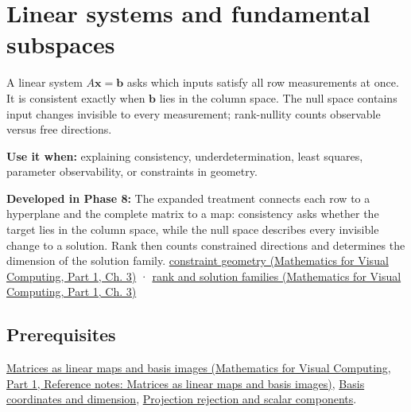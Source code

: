 \hypertarget{appendix-8572a4a060c1}{}\label{referencestart:appendix-8572a4a060c1}
\section{Linear systems and fundamental subspaces}\label{appendix-8572a4a060c1-linear-systems-and-fundamental-subspaces}

\hypertarget{appendix-8572a4a060c1-linear-systems-and-fundamental-subspaces}{}

A linear system \(A\mathbf x=\mathbf b\) asks which inputs satisfy all row measurements at once. It is consistent exactly when \(\mathbf b\) lies in the column space. The null space contains input changes invisible to every measurement; rank-nullity counts observable versus free directions.

\textbf{Use it when:} explaining consistency, underdetermination, least squares, parameter observability, or constraints in geometry.

\textbf{Developed in Phase 8:} The expanded treatment connects each row to a hyperplane and the complete matrix to a map: consistency asks whether the target lies in the column space, while the null space describes every invisible change to a solution. Rank then counts constrained directions and determines the dimension of the solution family. \href{../02-Mathematics-for-Visual-Computing-P01/main.pdf\#01-foundations-i-ch019-a-system-is-an-intersection-of-constraints}{constraint geometry (Mathematics for Visual Computing, Part 1, Ch. 3)} · \href{../02-Mathematics-for-Visual-Computing-P01/main.pdf\#01-foundations-i-ch019-rank-the-four-spaces-and-the-shape-of-the-answer}{rank and solution families (Mathematics for Visual Computing, Part 1, Ch. 3)}

\subsection{Prerequisites}\label{appendix-8572a4a060c1-prerequisites}

\hypertarget{appendix-8572a4a060c1-prerequisites}{}

\href{../02-Mathematics-for-Visual-Computing-P01/main.pdf\#appendix-bd39c3bf5d64}{Matrices as linear maps and basis images (Mathematics for Visual Computing, Part 1, Reference notes: Matrices as linear maps and basis images)}, \hyperref[appendix-ce0341f7ea0d]{Basis coordinates and dimension}, \hyperref[appendix-505a502c372a]{Projection rejection and scalar components}.


